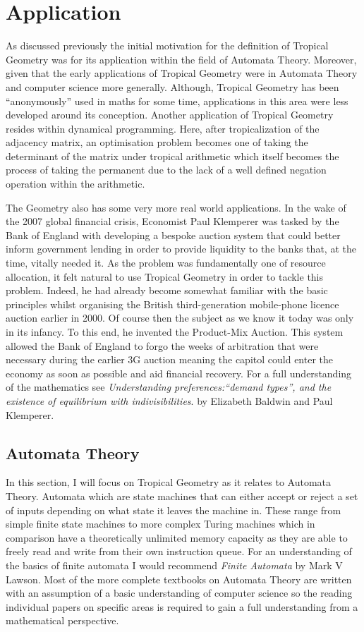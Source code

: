 \documentclass[12pt,a4paper]{amsart}
\theoremstyle{definition}
\theoremstyle{remark}
\begin{document}
\newpage
\section{Application}
As discussed previously the initial motivation for the definition of Tropical Geometry was for its application within the field of Automata Theory.
Moreover, given that the early applications of Tropical Geometry were in Automata Theory and computer science more generally.
Although, Tropical Geometry has been “anonymously” used in maths for some time, applications in this area were less developed around its conception. 
Another application of Tropical Geometry resides within dynamical programming. Here, after tropicalization of the adjacency matrix, an optimisation problem becomes one of taking the determinant of the matrix under tropical arithmetic which itself becomes the process of taking the permanent due to the lack of a well defined negation operation within the arithmetic.

The Geometry also has some very more real world applications.
In the wake of the 2007 global financial crisis, Economist Paul Klemperer was tasked by the Bank of England with developing a bespoke auction system that could better inform government lending in order to provide liquidity to the banks that, at the time, vitally needed it.
As the problem was fundamentally one of resource allocation, it felt natural to use Tropical Geometry in order to tackle this problem. Indeed, he had already become somewhat familiar with the basic principles whilst organising the British third-generation mobile-phone licence auction earlier in 2000\cite{binmore2002biggest}.
Of course then the subject as we know it today was only in its infancy.
To this end, he invented the Product-Mix Auction\cite{klemperer2010product}.
This system allowed the Bank of England to forgo the weeks of arbitration that were necessary during the earlier 3G auction meaning the capitol could enter the economy as soon as possible and aid financial recovery.
For a full understanding of the mathematics see \textit{Understanding preferences:“demand types”, and the existence of equilibrium with indivisibilities}.\cite{baldwin2019understanding} by Elizabeth Baldwin and Paul Klemperer.

\subsection{Automata Theory}
In this section, I will focus on Tropical Geometry as it relates to Automata Theory.
Automata which are state machines that can either accept or reject a set of inputs depending on what state it leaves the machine in.
These range from simple finite state machines to more complex Turing machines which in comparison have a theoretically unlimited memory capacity as they are able to freely read and write from their own instruction queue.
For an understanding of the basics of finite automata I would recommend \textit{Finite Automata}\cite{lawson2003finite} by Mark V Lawson. Most of the more complete textbooks on Automata Theory are written with an assumption of a basic understanding of computer science so the reading individual papers on specific areas is required to gain a full understanding from a mathematical perspective.
\end{document}
